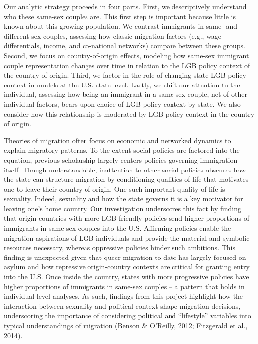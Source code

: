 \documentclass[
  11pt,
]{article}
\begin{document}
Our analytic strategy proceeds in four parts. First, we descriptively understand who these same-sex couples are. This first step is important because little is known about this growing population. We contrast immigrants in same- and different-sex couples, assessing how classic migration factors (e.g., wage differentials, income, and co-national networks) compare between these groups. Second, we focus on country-of-origin effects, modeling how same-sex immigrant couple representation changes over time in relation to the LGB policy context of the country of origin. Third, we factor in the role of changing state LGB policy context in models at the U.S. state level. Lastly, we shift our attention to the individual, assessing how being an immigrant in a same-sex couple, net of other individual factors, bears upon choice of LGB policy context by state. We also consider how this relationship is moderated by LGB policy context in the country of origin.

Theories of migration often focus on economic and networked dynamics to explain migratory patterns. To the extent social policies are factored into the equation, previous scholarship largely centers policies governing immigration itself. Though understandable, inattention to other social policies obscures how the state can structure migration by conditioning qualities of life that motivates one to leave their country-of-origin. One such important quality of life is sexuality. Indeed, sexuality and how the state governs it is a key motivator for leaving one's home country. Our investigation underscores this fact by finding that origin-countries with more LGB-friendly policies send higher proportions of immigrants in same-sex couples into the U.S. Affirming policies enable the migration aspirations of LGB individuals and provide the material and symbolic resources necessary, whereas oppressive policies hinder such ambitions. This finding is unexpected given that queer migration to date has largely focused on asylum and how repressive origin-country contexts are critical for granting entry into the U.S. Once inside the country, states with more progressive policies have higher proportions of immigrants in same-sex couples -- a pattern that holds in individual-level analyses. As such, findings from this project highlight how the interaction between sexuality and political context shape migration decisions, underscoring the importance of considering political and ``lifestyle'' variables into typical understandings of migration (\protect\hyperlink{ref-benson_2012}{Benson \& O'Reilly, 2012}; \protect\hyperlink{ref-fitzgerald_2014}{Fitzgerald et al., 2014}).
\end{document}
